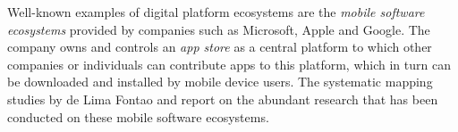 Well-known examples of digital platform ecosystems are the \emph{mobile software ecosystems} provided by companies such as Microsoft, Apple and Google.
The company owns and controls an \emph{app store} as a central platform to which other companies or individuals can contribute apps to this platform, which in turn can be downloaded and installed by mobile device users.
The systematic mapping studies by de Lima Fontao \etal \cite{deLimaFontao2015} and \cite{Steglich2019} report on the abundant research that has been conducted on these mobile software ecosystems.

